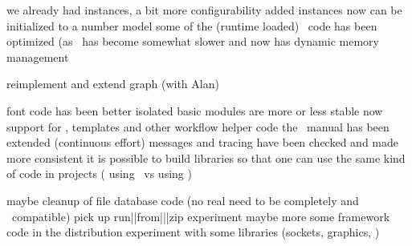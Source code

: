 \stoptopic

\StopSteps

\StartSteps

\starttopic[title={MetaPost\\recently done}]

    \startitemize
        \startitem we already had instances, a bit more configurability added \FlushStep \stopitem
        \startitem instances now can be initialized to a number model \FlushStep \stopitem
        \startitem some of the (runtime loaded) \METAFUN\ code has been optimized (as \METAPOST\ has become somewhat slower and now has dynamic memory management \FlushStep \stopitem
    \stopitemize

\stoptopic

\StopSteps

\StartSteps

\starttopic[title={MetaPost\\next on the todo list}]

    \startitemize
        \startitem reimplement and extend graph (with Alan) \FlushStep \stopitem
    \stopitemize

\stoptopic

\StopSteps

\StartSteps

\starttopic[title={Lua\\recently done}]

    \startitemize
        \startitem font code has been better isolated \FlushStep \stopitem
        \startitem basic modules are more or less stable now \FlushStep \stopitem
        \startitem support for \SQL, templates and other workflow helper code \FlushStep \stopitem
        \startitem the \CLD\ manual has been extended (continuous effort) \FlushStep \stopitem
        \startitem messages and tracing have been checked and made more consistent \FlushStep \stopitem
        \startitem it is possible to build libraries so that one can use the same kind of code in projects ( using \LUATEX\ vs  using \LUA) \FlushStep \stopitem
    \stopitemize

\stoptopic

\StopSteps

\StartSteps

\starttopic[title={Lua\\next on the todo list}]

    \startitemize
        \startitem maybe cleanup of file database code (no real need to be completely  and \TDS\ compatible) \FlushStep \stopitem
        \startitem pick up run||from|||zip experiment \FlushStep \stopitem
        \startitem maybe more some framework code in the distribution \FlushStep \stopitem
        \startitem experiment with some libraries (sockets, graphics, ) \FlushStep \stopitem
    \stopitemize

